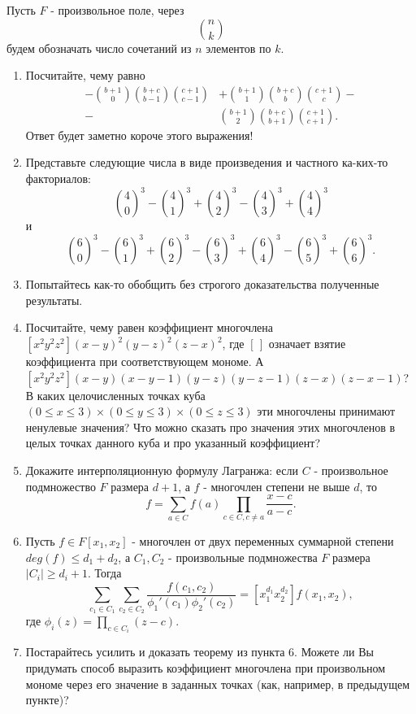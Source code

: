 Пусть $F$ - произвольное поле, через
	$$n \choose k$$
будем обозначать число сочетаний из $n$ элементов по $k$.
\begin{enumerate}
\item  Посчитайте, чему равно
\begin{align*}
-{b + 1 \choose 0}{b + c \choose b - 1}{c + 1 \choose c - 1} & + {b + 1 \choose 1}{b + c \choose b}{c + 1 \choose c} -\\
 - & {b + 1 \choose 2}{b + c \choose b + 1}{c + 1 \choose c + 1}.
\end{align*}
Ответ будет заметно короче этого выражения!

\item Представьте следующие числа в виде произведения и частного ка-\linebreak ких-то факториалов: $${4 \choose 0}^3 - {4 \choose 1}^3 + {4 \choose 2}^3 - {4 \choose 3}^3 + {4 \choose 4}^3$$ и $${6 \choose 0}^3 - {6 \choose 1}^3 + {6 \choose 2}^3 - {6 \choose 3}^3 + {6 \choose 4}^3 - {6 \choose 5}^3 + {6 \choose 6}^3.$$

\item Попытайтесь как-то обобщить без строгого доказательства полученные результаты.

\item Посчитайте, чему равен коэффициент многочлена $[x^2y^2z^2](x-y)^2(y-z)^2(z-x)^2$, где $[\,]$ означает взятие коэффициента при соответствующем мономе. А $[x^2y^2z^2](x-y)(x-y-1)(y-z)(y-z-1)(z-x)(z-x-1)$? В каких целочисленных точках куба $(0 \leq x \leq 3) \times (0 \leq y \leq 3) \times (0 \leq z \leq 3)$ эти многочлены принимают ненулевые значения? Что можно сказать про значения этих многочленов в целых точках данного куба и про указанный коэффициент?

\item Докажите интерполяционную формулу Лагранжа: если $C$ - произвольное подмножество $F$ размера $d + 1$, а $f$ - многочлен степени не выше $d$, то $$f = \sum\limits_{a \in C}{f(a){\prod_{c \in C, c \neq a}\frac{x - c}{a - c}}}.$$

\item Пусть $f \in F[x_1,x_2]$ - многочлен от двух переменных суммарной степени $deg(f) \leq d_1 + d_2$, а $C_1,C_2$ - произвольные подмножества $F$ размера $|C_i| \geq d_i + 1$. Тогда $$\sum\limits_{c_1 \in C_1} \sum\limits_{c_2 \in C_2} \frac{f(c_1,c_2)}{\phi_1'(c_1)\phi_2'(c_2)} = [x_1^{d_1}x_2^{d_2}]f(x_1,x_2),$$ где $\phi_i(z) = \prod_{c\in C_i}{(z-c)}$.

\item Постарайтесь усилить и доказать теорему из пункта 6. Можете ли Вы придумать способ выразить коэффициент многочлена при произвольном мономе через его значение в заданных точках (как, например, в предыдущем пункте)?


\end{enumerate}
